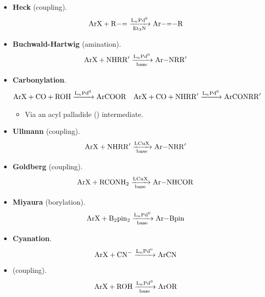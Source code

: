 \documentclass[../notes.tex]{subfiles}
\begin{document}
\begin{itemize}
\begin{itemize}
\begin{center}
                \arrow{->[\ce{L_nPd^0}]}
            \schemestop
        \end{center}
        \item \textbf{Heck} (coupling).
        \begin{equation*}
            \ce{ArX + R-= ->[L_nPd^0][Et3N] Ar-=-R}
        \end{equation*}
        \item \textbf{Buchwald-Hartwig} (amination).
        \begin{equation*}
            \ce{ArX + NHRR$'$ ->[L_nPd^0][base] Ar-NRR$'$}
        \end{equation*}
        \item \textbf{Carbonylation}.
        \begin{align*}
            \ce{ArX + CO + ROH ->[L_nPd^0] ArCOOR}&&
            \ce{ArX + CO + NHRR$'$ ->[L_nPd^0] ArCONRR$'$}
        \end{align*}
        \begin{itemize}
            \item Via an acyl palladide () intermediate.
        \end{itemize}
        \item \textbf{Ullmann} (coupling).
        \begin{equation*}
            \ce{ArX + NHRR$'$ ->[LCuX][base] Ar-NRR$'$}
        \end{equation*}
        \item \textbf{Goldberg} (coupling).
        \begin{equation*}
            \ce{ArX + RCONH2 ->[LCuX][base] Ar-NHCOR}
        \end{equation*}
        \item \textbf{Miyaura} (borylation).
        \begin{equation*}
            \ce{ArX + B2pin2 ->[L_nPd^0][base] Ar-Bpin}
        \end{equation*}
        \item \textbf{Cyanation}.
        \begin{equation*}
            \ce{ArX + CN- ->[L_nPd^0] ArCN}
        \end{equation*}
        \item \textbf{} (coupling).
        \begin{equation*}
            \ce{ArX + ROH ->[L_nPd^0][base] ArOR}
        \end{equation*}

\end{itemize}
\end{itemize}
\end{document}
